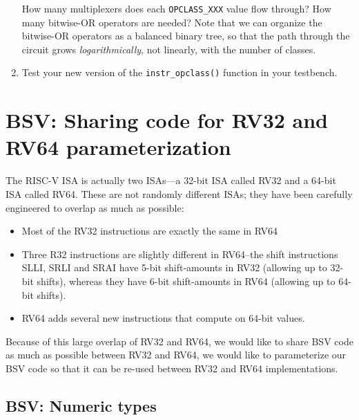 \begin{enumerate}
  How many multiplexers does each \verb|OPCLASS_XXX| value flow
  through?  How many bitwise-OR operators are needed?  Note that we
  can organize the bitwise-OR operators as a balanced binary tree, so
  that the path through the circuit grows \emph{logarithmically}, not
  linearly, with the number of classes.

\item Test your new version of the \verb|instr_opclass()| function in
  your testbench.

\end{enumerate}


\section{BSV: Sharing code for RV32 and RV64 {\via} parameterization}

\label{BSV_Paramterizing_XLEN}


The RISC-V ISA is actually two ISAs---a 32-bit ISA called RV32 and a
64-bit ISA called RV64.  These are not randomly different ISAs; they
have been carefully engineered to overlap as much as possible:

\begin{itemize}

\item Most of the RV32 instructions are exactly the same in RV64

\item Three R32 instructions are slightly different in RV64--the shift
instructions SLLI, SRLI and SRAI have 5-bit shift-amounts in RV32
(allowing up to 32-bit shifts), whereas they have 6-bit shift-amounts
in RV64 (allowing up to 64-bit shifts).

\item RV64 adds several new instructions that compute on 64-bit values.

\end{itemize}

Because of this large overlap of RV32 and RV64, we would like to share
BSV code as much as possible between RV32 and RV64, {\ie} we would
like to parameterize our BSV code so that it can be re-used between
RV32 and RV64 implementations.


\subsection{BSV: Numeric types}

